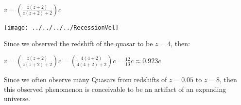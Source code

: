 \documentclass{article}
\begin{document}
\begin{center}
	$\boxed{v = \left(\frac{z(z+2)}{z(z+2)+2}\right)c}
	$
\end{center}
\begin{center}
	
	\texttt{[image: ../../../../RecessionVel]}
	\label{fig:recessionvel}
\end{center}
Since we observed the redshift of the quasar to be $z=4$, then:

\begin{center}
	$\boxed{v = \left(\frac{z(z+2)}{z(z+2)+2}\right)c = \left(\frac{4(4+2)}{4(4+2)+2}\right)c = \frac{12}{13}c \approx 0.923c}
	$
\end{center}

Since we often observe many Quasars from redshifts of $z=0.05$ to $z = 8$, then this observed phenomenon is conceivable to be an artifact of an expanding universe. 
\end{document}
